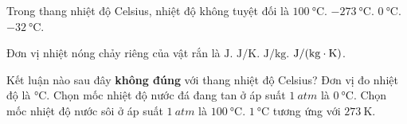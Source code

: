 \begin{ex}
	Trong thang nhiệt độ Celsius, nhiệt độ không tuyệt đối là
	\choice
	{$\SI{100}{\celsius}$.}
	{\True $\SI{-273}{\celsius}$.}
	{$\SI{0}{\celsius}$.}
	{$\SI{-32}{\celsius}$.}
	\loigiai{}
\end{ex}
\begin{ex}
	Đơn vị nhiệt nóng chảy riêng của vật rắn là
	\choice
	{$\si{\joule}$.}
	{$\si{\joule/\kelvin}$.}
	{\True $\si{\joule/\kilogram}$.}
	{$\si{\joule/\left(\kilogram\cdot\kelvin\right)}$.}
	\loigiai{}
\end{ex}

\begin{ex}
	Kết luận nào sau đây \textbf{không đúng} với thang nhiệt độ Celsius?
	\choice
	{Đơn vị đo nhiệt độ là $\si{\celsius}$.}
	{Chọn mốc nhiệt độ nước đá đang tan ở áp suất $\SI{1}{atm}$ là $\SI{0}{\celsius}$.}
	{Chọn mốc nhiệt độ nước sôi ở áp suất $\SI{1}{atm}$ là $\SI{100}{\celsius}$.}
	{\True $\SI{1}{\celsius}$ tương ứng với $\SI{273}{\kelvin}$.}
	\loigiai{}
\end{ex}
